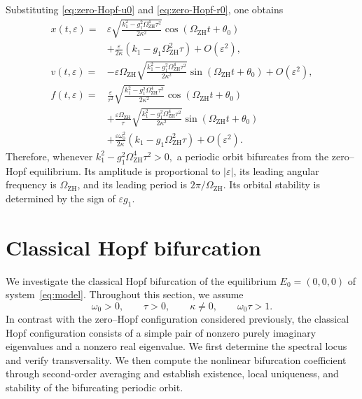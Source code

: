 \documentclass[11pt,reqno]{amsart}
\theoremstyle{plain}
\theoremstyle{definition}
\theoremstyle{remark}
\begin{document}
Substituting
\eqref{eq:zero-Hopf-u0} and
\eqref{eq:zero-Hopf-r0}, one obtains
\begin{equation}
\label{eq:zero-Hopf-explicit-periodic-orbit}
\begin{aligned}
x(t,\varepsilon)
={}&
\varepsilon
\sqrt{
\frac{
k_1^2
-
g_1^2\Omega_{\mathrm{ZH}}^4\tau^2
}{
2\kappa^2
}
}
\cos\left(
\Omega_{\mathrm{ZH}}t+\theta_0
\right)
\\
&+
\frac{\varepsilon}{2\kappa}
\left(
k_1
-
g_1\Omega_{\mathrm{ZH}}^2\tau
\right)
+
O(\varepsilon^2),
\\[3mm]
v(t,\varepsilon)
={}&
-\varepsilon\Omega_{\mathrm{ZH}}
\sqrt{
\frac{
k_1^2
-
g_1^2\Omega_{\mathrm{ZH}}^4\tau^2
}{
2\kappa^2
}
}
\sin\left(
\Omega_{\mathrm{ZH}}t+\theta_0
\right)
+
O(\varepsilon^2),
\\[3mm]
f(t,\varepsilon)
={}&
\frac{\varepsilon}{\tau^2}
\sqrt{
\frac{
k_1^2
-
g_1^2\Omega_{\mathrm{ZH}}^4\tau^2
}{
2\kappa^2
}
}
\cos\left(
\Omega_{\mathrm{ZH}}t+\theta_0
\right)
\\
&+
\frac{
\varepsilon\Omega_{\mathrm{ZH}}
}{\tau}
\sqrt{
\frac{
k_1^2
-
g_1^2\Omega_{\mathrm{ZH}}^4\tau^2
}{
2\kappa^2
}
}
\sin\left(
\Omega_{\mathrm{ZH}}t+\theta_0
\right)
\\
&+
\frac{
\varepsilon\omega_0^2
}{2\kappa}
\left(
k_1
-
g_1\Omega_{\mathrm{ZH}}^2\tau
\right)
+
O(\varepsilon^2).
\end{aligned}
\end{equation}
Therefore, whenever
$
k_1^2
-
g_1^2\Omega_{\mathrm{ZH}}^4\tau^2
>0,
$
a periodic orbit bifurcates from the zero--Hopf equilibrium. Its
amplitude is proportional to \(|\varepsilon|\), its leading angular
frequency is \(\Omega_{\mathrm{ZH}}\), and its leading period is
\(2\pi/\Omega_{\mathrm{ZH}}\). Its orbital stability is determined by
the sign of \(\varepsilon g_1\).


\section{Classical Hopf bifurcation}
\label{sec:classical-Hopf}

We investigate the classical Hopf bifurcation of the equilibrium
$E_0=(0,0,0)$ of system~\eqref{eq:model}. Throughout this section,
we assume
\[
\omega_0>0,\qquad
\tau>0,\qquad
\kappa\neq0,\qquad
\omega_0\tau>1.
\]
In contrast with the zero--Hopf configuration considered previously,
the classical Hopf configuration consists of a simple pair of
nonzero purely imaginary eigenvalues and a nonzero real eigenvalue.
We first determine the spectral locus and verify transversality.
We then compute the nonlinear bifurcation coefficient through
second-order averaging and establish existence, local uniqueness,
and stability of the bifurcating periodic orbit.
\end{document}
